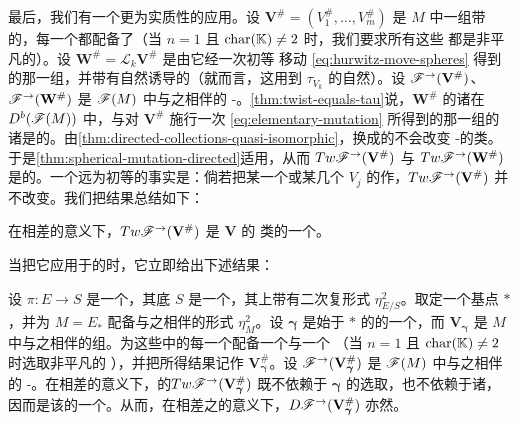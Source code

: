 最后，我们有一个更为实质性的应用。设 $\mathbf{V}^{\#}=(V^{\#}_1,\ldots,V^{\#}_m)$ 是 $M$ 中一组带\trFrame{}的\trExact\trLagrange\trSphere，每一个都配备了\trBraneStructure（当 $n=1$ 且 $\mathrm{char}(\mathbb{K})\neq 2$ 时，我们要求所有这些 \trPinStructure{}都是非平凡的）。设 $\mathbf{W}^{\#}=\mathscr{L}_k\mathbf{V}^{\#}$ 是由它经一次初等 \trHurwitz{}移动 \eqref{eq:hurwitz-move-spheres} 得到的那一组，并带有自然诱导的\trBraneStructure（就\trGrading{}而言，这用到 $\tau_{V_k}$ 的自然\trGrading）。设 $\mathscr{F}^{\rightarrow}(\mathbf{V}^{\#})$、$\mathscr{F}^{\rightarrow}(\mathbf{W}^{\#})$ 是 $\mathscr{F}(M)$ 中与之相伴的\trDirected{} \trAinfty-\trSubcategory。\cref{thm:twist-equals-tau}说，$\mathbf{W}^{\#}$ 的诸\trObject{}在 $D^b(\mathscr{F}(M))$ 中，与对 $\mathbf{V}^{\#}$ 施行一次\trMutation{} \eqref{eq:elementary-mutation} 所得到的那一组的诸\trObject{}是\trIsomorphic{}的。由\cref{thm:directed-collections-quasi-isomorphic}，换成\trIsomorphic{}的\trObject{}不会改变\trDirected{} \trAinfty-\trCategory{}的\trQuasiisomorphism{}类。于是\cref{thm:spherical-mutation-directed}适用，从而 $Tw\mathscr{F}^{\rightarrow}(\mathbf{V}^{\#})$ 与 $Tw\mathscr{F}^{\rightarrow}(\mathbf{W}^{\#})$ 是\trQuasiequivalent{}的。一个远为初等的事实是：倘若把某一个或某几个 $V_j$ 的\trGrading{}作\trSuspension，$Tw\mathscr{F}^{\rightarrow}(\mathbf{V}^{\#})$ 并不改变。我们把结果总结如下：
\begin{theorem}\label{thm:twisted-directed-hurwitz-invariant}
在相差\trQuasiequivalence{}的意义下，$Tw\mathscr{F}^{\rightarrow}(\mathbf{V}^{\#})$ 是 $\mathbf{V}$ 的 \trHurwitz{}\trEquivalence{}类的一个\trInvariant。
\end{theorem}
\noqed
当把它应用于\trVanishingCycle{}的\trDistinguishedBasis{}时，它立即给出下述结果：
\begin{corollary}\label{thm:twisted-directed-fibration-invariant}
设 $\pi\colon E\to S$ 是一个\trLefschetzFibration，其底 $S$ 是一个\trDisk，其上带有\trRelative{}二次复\trVolume{}形式 $\eta^2_{E/S}$。取定一个基点 $\ast$，并为 $M=E_{\ast}$ 配备与之相伴的形式 $\eta^2_{M}$。设 $\boldsymbol{\gamma}$ 是始于 $\ast$ 的\trVanishingPath{}的一个\trDistinguishedBasis，而 $\mathbf{V}_{\boldsymbol{\gamma}}$ 是 $M$ 中与之相伴的\trVanishingCycle{}组。为这些\trCycle{}中的每一个配备一个\trGrading{}与一个 \trPinStructure（当 $n=1$ 且 $\mathrm{char}(\mathbb{K})\neq 2$ 时选取非平凡的 \trPinStructure），并把所得结果记作 $\mathbf{V}^{\#}_{\boldsymbol{\gamma}}$。设 $\mathscr{F}^{\rightarrow}(\mathbf{V}^{\#}_{\boldsymbol{\gamma}})$ 是 $\mathscr{F}(M)$ 中与之相伴的\trDirected{} \trAinfty-\trSubcategory。在相差\trQuasiequivalence{}的意义下，\trTwistedComplex{}的\trCategory{}$Tw\mathscr{F}^{\rightarrow}(\mathbf{V}^{\#}_{\boldsymbol{\gamma}})$ 既不依赖于 $\boldsymbol{\gamma}$ 的选取，也不依赖于诸\trGrading，因而是该\trLefschetzFibration{}的一个\trInvariant。从而，在相差\trTriangulated\trCategory{}之\trEquivalence{}的意义下，\trDerivedCategory{}$D\mathscr{F}^{\rightarrow}(\mathbf{V}^{\#}_{\boldsymbol{\gamma}})$ 亦然。
\end{corollary}
